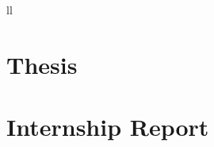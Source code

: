 \documentclass[
11pt, %
english,
singlespacing, %
headsepline, %
]{BachelorThesis} %
\begin{document}
\begin{abbreviations}{ll}
\end{abbreviations}


\mainmatter %

\pagestyle{thesis} %


\part{Thesis}

 

 
 



\part{Internship Report}

 

 
 





\printbibliography[title={References}]

\end{document}
